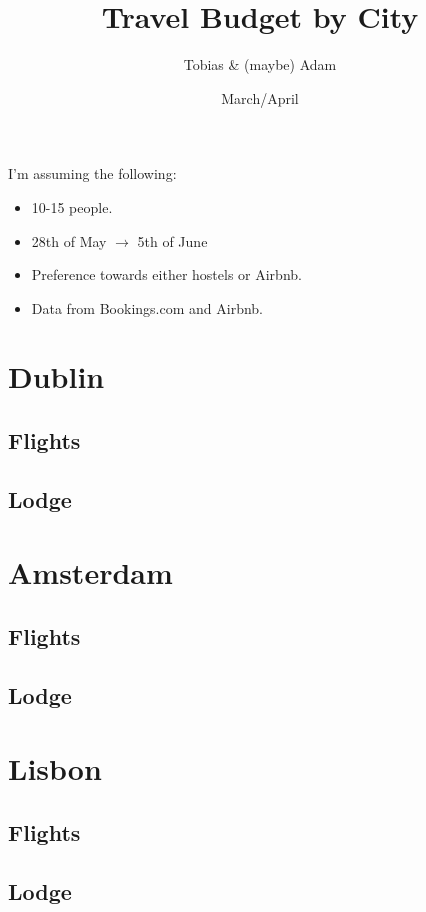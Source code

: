 \documentclass[12pt]{article}
\title{Travel Budget by City}
\author{Tobias \& (maybe) Adam}
\date{March/April}
\begin{document}
	\maketitle
	I'm assuming the following:
	\begin{itemize}
		\item 10-15 people.
		\item 28th of May $\rightarrow$ 5th of June
		\item Preference towards either hostels or Airbnb.
		\item Data from Bookings.com and Airbnb.
	\end{itemize}
	
	\section{Dublin}
	\subsection{Flights}
	
	\subsection{Lodge}
	
	\section{Amsterdam}
	
	\subsection{Flights}
	
	\subsection{Lodge}
	
	\section{Lisbon}
	
	\subsection{Flights}
	
	\subsection{Lodge}
\end{document}
